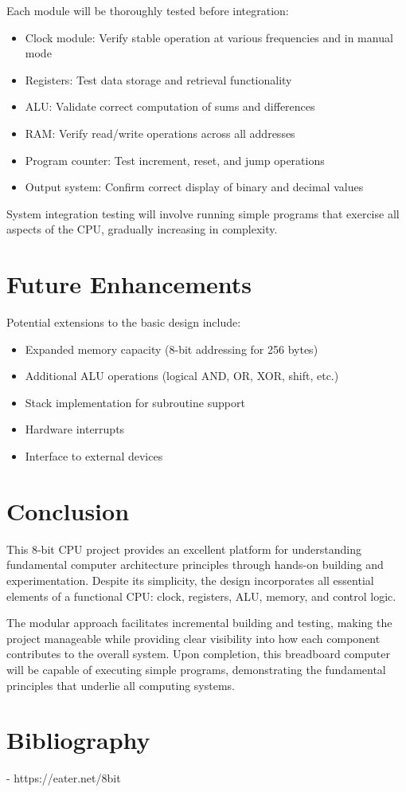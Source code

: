 \documentclass[a4paper,12pt]{article}
\begin{document}
Each module will be thoroughly tested before integration:

\begin{itemize}
    \item Clock module: Verify stable operation at various frequencies and in manual mode
    \item Registers: Test data storage and retrieval functionality
    \item ALU: Validate correct computation of sums and differences
    \item RAM: Verify read/write operations across all addresses
    \item Program counter: Test increment, reset, and jump operations
    \item Output system: Confirm correct display of binary and decimal values
\end{itemize}

System integration testing will involve running simple programs that exercise all aspects of the CPU, gradually increasing in complexity.

\section{Future Enhancements}

Potential extensions to the basic design include:

\begin{itemize}
    \item Expanded memory capacity (8-bit addressing for 256 bytes)
    \item Additional ALU operations (logical AND, OR, XOR, shift, etc.)
    \item Stack implementation for subroutine support
    \item Hardware interrupts
    \item Interface to external devices
\end{itemize}

\section{Conclusion}

This 8-bit CPU project provides an excellent platform for understanding fundamental computer architecture principles through hands-on building and experimentation. Despite its simplicity, the design incorporates all essential elements of a functional CPU: clock, registers, ALU, memory, and control logic.

The modular approach facilitates incremental building and testing, making the project manageable while providing clear visibility into how each component contributes to the overall system. Upon completion, this breadboard computer will be capable of executing simple programs, demonstrating the fundamental principles that underlie all computing systems.

\section{Bibliography}
- https://eater.net/8bit
\end{document}
